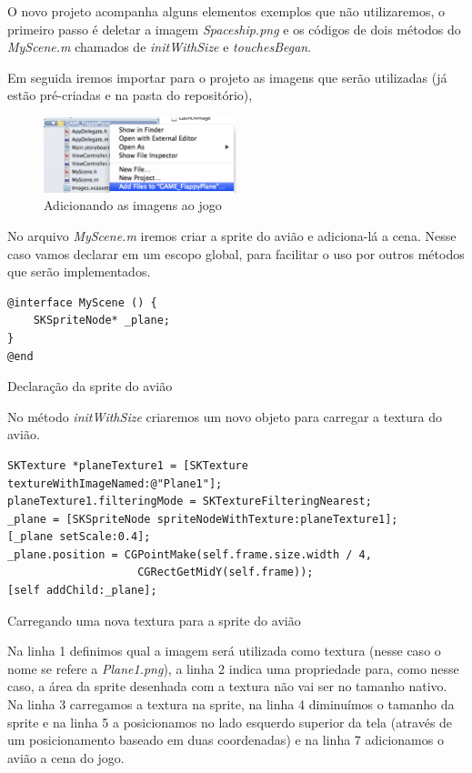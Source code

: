 \documentclass[a4paper,12pt,brazil,doubleside]{book}
\begin{document}
\begin{singlespace}
O novo projeto acompanha alguns elementos exemplos que não utilizaremos, o primeiro passo é deletar a imagem \emph{Spaceship.png} e os códigos de dois métodos do \emph{MyScene.m} chamados de \emph{initWithSize} e \emph{touchesBegan}.

Em seguida iremos importar para o projeto as imagens que serão utilizadas (já estão pré-criadas e na pasta do repositório),

\begin{figure}[H]
  \centering
  \includegraphics[width=0.5\textwidth]{figuras/6/plane3.png}
  \caption{Adicionando as imagens ao jogo}
  \label{fig:a}
\end{figure}

No arquivo \emph{MyScene.m} iremos criar a sprite do avião e adiciona-lá a cena.
Nesse caso vamos declarar em um escopo global, para facilitar o uso por outros métodos que serão implementados.

\begin{listing}[H]
\begin{verbatim}
@interface MyScene () {
    SKSpriteNode* _plane;
}
@end
\end{verbatim}
\caption{Declaração da sprite do avião}
\end{listing}

No método \emph{initWithSize} criaremos um novo objeto para carregar a textura do avião.

\begin{listing}[H]
\begin{verbatim}
SKTexture *planeTexture1 = [SKTexture textureWithImageNamed:@"Plane1"];
planeTexture1.filteringMode = SKTextureFilteringNearest;
_plane = [SKSpriteNode spriteNodeWithTexture:planeTexture1];
[_plane setScale:0.4];
_plane.position = CGPointMake(self.frame.size.width / 4, 
					CGRectGetMidY(self.frame));
[self addChild:_plane];
\end{verbatim}
\caption{Carregando uma nova textura para a sprite do avião}
\end{listing}

Na linha 1 definimos qual a imagem será utilizada como textura (nesse caso o nome se refere a \emph{Plane1.png}), a linha 2 indica uma propriedade para, como nesse caso, a área da sprite desenhada com a textura não vai ser no tamanho nativo.
Na linha 3 carregamos a textura na sprite, na linha 4 diminuímos o tamanho da sprite e na linha 5 a posicionamos no lado esquerdo superior da tela (através de um posicionamento baseado em duas coordenadas) e na linha 7 adicionamos o avião a cena do jogo.


\end{singlespace}
\end{document}
